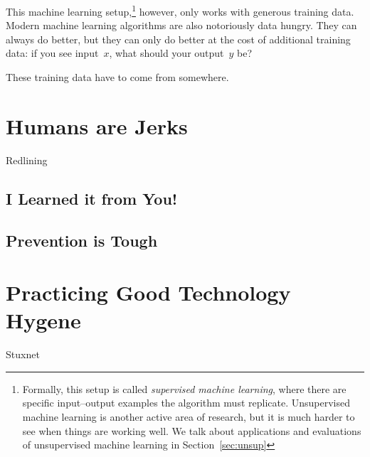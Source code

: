 This machine learning setup,\footnote{Formally, this setup is called
  \emph{supervised machine learning}, where there are specific
  input--output examples the algorithm must replicate.  Unsupervised
  machine learning is another active area of research, but it is much
  harder to see when things are working well.  We talk about
  applications and evaluations of unsupervised machine learning in
  Section~\ref{sec:unsup}} however, only works with generous training
data.  Modern machine learning algorithms are also notoriously data
hungry.  They can always do better, but they can only do better at the
cost of additional training data: if you see input~$x$, what should
your output~$y$ be?

These training data have to come from somewhere.  

\section{Humans are Jerks}

Redlining

\subsection{I Learned it from You!}

\subsection{Prevention is Tough}

\section{Practicing Good Technology Hygene}

Stuxnet
